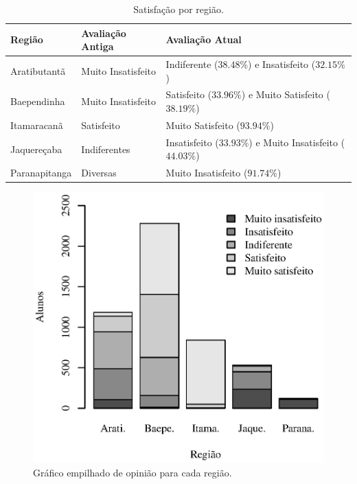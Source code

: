 \documentclass[10pt,a4paper,oneside]{article}
\newcommand{\arat}{Aratibutantã\xspace}
\newcommand{\baep}{Baependinha\xspace}
\newcommand{\itam}{Itamaracanã\xspace}
\newcommand{\jaqu}{Jaquereçaba\xspace}
\newcommand{\para}{Paranapitanga\xspace}
\begin{document}
\begin{table}[!h]
	\footnotesize
	\centering
	\caption{Satisfação por região.}
	\label{table:satisfacao-regiao}
	\begin{tabular}{l l l}
		\toprule
		\textbf{Região} & \textbf{Avaliação Antiga} & \textbf{Avaliação Atual}                \\
		\midrule
		\arat  & Muito Insatisfeito & Indiferente ($38.48\%$) e Insatisfeito ($32.15\%$)      \\
		\baep  & Muito Insatisfeito & Satisfeito ($33.96\%$) e Muito Satisfeito ($38.19\%$)   \\
		\itam  & Satisfeito         & Muito Satisfeito ($93.94\%$)                            \\
		\jaqu  & Indiferentes       & Insatisfeito ($33.93\%$) e Muito Insatisfeito ($44.03\%$) \\
		\para  & Diversas           & Muito Insatisfeito ($91.74\%$)                          \\
		\bottomrule
	\end{tabular}
\end{table}
\vspace{-4em}
\begin{figure}[!h]
	\centering
	\includegraphics[scale=0.70]{plots/stacked_opiniao_por_regiao.eps}
	\caption{Gráfico empilhado de opinião para cada região.}
	\label{fig:stacked-opiniao-por-regiao}
\end{figure}
\end{document}
